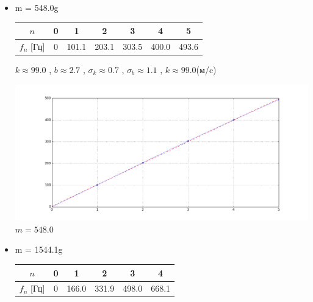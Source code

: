 \documentclass[8pt]{article}
\begin{document}
\begin{enumerate}
\begin{itemize}
        \item m = 548.0g
                    \begin{center}
                    \begin{tabular}{|c|c|c|c|c|c|c|}
                            \hline 
                                $n$ & 0 & 1 & 2 & 3 & 4 & 5 \\
                            \hline
                                $f_n$ [Гц] &0&101.1&203.1&303.5&400.0&493.6\\
                            \hline
                    \end{tabular}
                    \end{center}
            $k \approx 99.0$  , $b \approx 2.7$ , $\sigma_k \approx 0.7$ , $\sigma_b \approx 1.1$ , $k \approx 99.0$(м/c)\\
            \begin{center} 
                \includegraphics[width=5in]{m1.png} \\ \tiny{$m = 548.0$}
            \end{center}
        \item m = 1544.1g
                    \begin{center}
                    \begin{tabular}{|c|c|c|c|c|c|}
                            \hline 
                                $n$ & 0 & 1 & 2 & 3 & 4  \\
                            \hline
                                $f_n$ [Гц] &0&166.0&331.9&498.0&668.1\\
                            \hline
                    \end{tabular}

\end{center}
\end{itemize}
\end{enumerate}
\end{document}
